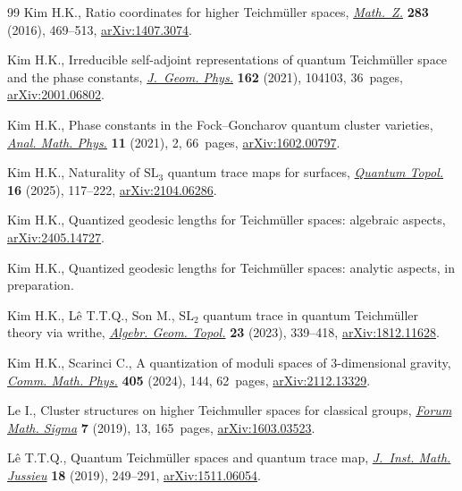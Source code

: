 \begin{thebibliography}{99}
Kim H.K., Ratio coordinates for higher {T}eichm\"{u}ller spaces,
 \href{https://doi.org/10.1007/s00209-015-1607-4}{\textit{Math.~Z.}}
 \textbf{283} (2016), 469--513,
 \href{http://arxiv.org/abs/1407.3074}{arXiv:1407.3074}.

Kim H.K., Irreducible self-adjoint representations of quantum {T}eichm\"{u}ller
 space and the phase constants,
 \href{https://doi.org/10.1016/j.geomphys.2021.104103}{\textit{J.~Geom.
 Phys.}} \textbf{162} (2021), 104103, 36~pages,
 \href{http://arxiv.org/abs/2001.06802}{arXiv:2001.06802}.

Kim H.K., Phase constants in the {F}ock--{G}oncharov quantum cluster varieties,
 \href{https://doi.org/10.1007/s13324-020-00439-3}{\textit{Anal. Math. Phys.}}
 \textbf{11} (2021), 2, 66~pages,
 \href{http://arxiv.org/abs/1602.00797}{arXiv:1602.00797}.

Kim H.K., Naturality of {$\mathrm{SL}_3$} quantum trace maps for surfaces,
 \href{https://doi.org/10.4171/qt/214}{\textit{Quantum Topol.}} \textbf{16}
 (2025), 117--222, \href{http://arxiv.org/abs/2104.06286}{arXiv:2104.06286}.

Kim H.K., Quantized geodesic lengths for {T}eichm\"{u}ller spaces: algebraic
 aspects, \href{http://arxiv.org/abs/2405.14727}{arXiv:2405.14727}.

Kim H.K., Quantized geodesic lengths for {T}eichm\"uller spaces: analytic
 aspects, {i}n preparation.

Kim H.K., L\^{e} T.T.Q., Son M., {$\mathrm{SL}_2$} quantum trace in quantum
 {T}eichm\"{u}ller theory via writhe,
 \href{https://doi.org/10.2140/agt.2023.23.339}{\textit{Algebr. Geom. Topol.}}
 \textbf{23} (2023), 339--418,
 \href{http://arxiv.org/abs/1812.11628}{arXiv:1812.11628}.

Kim H.K., Scarinci C., A quantization of moduli spaces of $3$-dimensional
 gravity, \href{https://doi.org/10.1007/s00220-024-05012-8}{\textit{Comm.
 Math. Phys.}} \textbf{405} (2024), 144, 62~pages,
 \href{http://arxiv.org/abs/2112.13329}{arXiv:2112.13329}.

Le I., Cluster structures on higher {T}eichmuller spaces for classical groups,
 \href{https://doi.org/10.1017/fms.2019.5}{\textit{Forum Math. Sigma}}
 \textbf{7} (2019), 13, 165~pages,
 \href{http://arxiv.org/abs/1603.03523}{arXiv:1603.03523}.

L\^{e} T.T.Q., Quantum {T}eichm\"{u}ller spaces and quantum trace map,
 \href{https://doi.org/10.1017/s1474748017000068}{\textit{J.~Inst. Math.
 Jussieu}} \textbf{18} (2019), 249--291,
 \href{http://arxiv.org/abs/1511.06054}{arXiv:1511.06054}.


\end{thebibliography}
